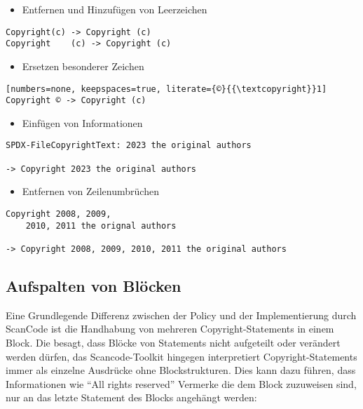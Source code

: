 \begin{itemize}
    \item Entfernen und Hinzufügen von Leerzeichen
\end{itemize}
\begin{lstlisting}[numbers=none, keepspaces=true]
Copyright(c) -> Copyright (c)
Copyright    (c) -> Copyright (c)
\end{lstlisting}

\begin{itemize}
    \item Ersetzen besonderer Zeichen
\end{itemize}
\begin{lstlisting}[numbers=none, keepspaces=true, literate={©}{{\textcopyright}}1]
Copyright © -> Copyright (c)
\end{lstlisting}

\begin{itemize}
    \item Einfügen von Informationen
\end{itemize}
\begin{lstlisting}[numbers=none, keepspaces=true]
SPDX-FileCopyrightText: 2023 the original authors

-> Copyright 2023 the original authors
\end{lstlisting}

\begin{itemize}
    \item Entfernen von Zeilenumbrüchen
\end{itemize}
\begin{lstlisting}[numbers=none, keepspaces=true]
Copyright 2008, 2009,
    2010, 2011 the orignal authors

-> Copyright 2008, 2009, 2010, 2011 the original authors
\end{lstlisting}


\subsection{Aufspalten von Blöcken}

Eine Grundlegende Differenz zwischen der Policy und der Implementierung durch ScanCode ist die Handhabung von mehreren Copyright-Statements in einem Block.
Die  besagt, dass Blöcke von Statements nicht aufgeteilt oder verändert werden dürfen, das Scancode-Toolkit hingegen interpretiert Copyright-Statements immer als einzelne Ausdrücke ohne Blockstrukturen.
Dies kann dazu führen, dass Informationen wie \enquote{All rights reserved} Vermerke die dem Block zuzuweisen sind, nur an das letzte Statement des Blocks angehängt werden:

